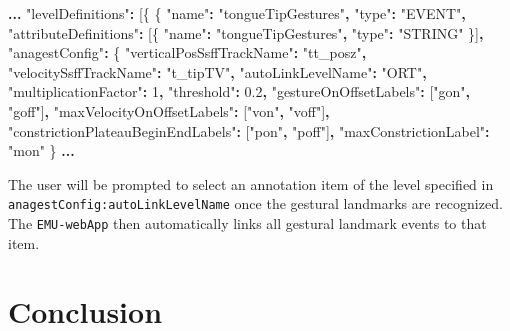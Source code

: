 \documentclass[
]{book}
\newenvironment{Shaded}{\begin{snugshade}}{\end{snugshade}}
\newcommand{\DecValTok}[1]{\textcolor[rgb]{0.00,0.00,0.81}{#1}}
\newcommand{\FloatTok}[1]{\textcolor[rgb]{0.00,0.00,0.81}{#1}}
\newcommand{\NormalTok}[1]{#1}
\newcommand{\OperatorTok}[1]{\textcolor[rgb]{0.81,0.36,0.00}{\textbf{#1}}}
\newcommand{\StringTok}[1]{\textcolor[rgb]{0.31,0.60,0.02}{#1}}
\begin{document}
\begin{Shaded}
\begin{Highlighting}[]
\OperatorTok{...}
\StringTok{"levelDefinitions"}\OperatorTok{:}\NormalTok{ [\{}
\NormalTok{  \{}
    \StringTok{"name"}\OperatorTok{:} \StringTok{"tongueTipGestures"}\OperatorTok{,}
    \StringTok{"type"}\OperatorTok{:} \StringTok{"EVENT"}\OperatorTok{,}
    \StringTok{"attributeDefinitions"}\OperatorTok{:}\NormalTok{ [\{}
        \StringTok{"name"}\OperatorTok{:} \StringTok{"tongueTipGestures"}\OperatorTok{,}
        \StringTok{"type"}\OperatorTok{:} \StringTok{"STRING"}
\NormalTok{    \}]}\OperatorTok{,}
    \StringTok{"anagestConfig"}\OperatorTok{:}\NormalTok{ \{}
        \StringTok{"verticalPosSsffTrackName"}\OperatorTok{:} \StringTok{"tt\_posz"}\OperatorTok{,}
        \StringTok{"velocitySsffTrackName"}\OperatorTok{:} \StringTok{"t\_tipTV"}\OperatorTok{,}
        \StringTok{"autoLinkLevelName"}\OperatorTok{:} \StringTok{"ORT"}\OperatorTok{,}
        \StringTok{"multiplicationFactor"}\OperatorTok{:} \DecValTok{1}\OperatorTok{,}
        \StringTok{"threshold"}\OperatorTok{:} \FloatTok{0.2}\OperatorTok{,}
        \StringTok{"gestureOnOffsetLabels"}\OperatorTok{:}\NormalTok{ [}\StringTok{"gon"}\OperatorTok{,} \StringTok{"goff"}\NormalTok{]}\OperatorTok{,}
        \StringTok{"maxVelocityOnOffsetLabels"}\OperatorTok{:}\NormalTok{ [}\StringTok{"von"}\OperatorTok{,} \StringTok{"voff"}\NormalTok{]}\OperatorTok{,}
        \StringTok{"constrictionPlateauBeginEndLabels"}\OperatorTok{:}\NormalTok{ [}\StringTok{"pon"}\OperatorTok{,} \StringTok{"poff"}\NormalTok{]}\OperatorTok{,}
        \StringTok{"maxConstrictionLabel"}\OperatorTok{:} \StringTok{"mon"}
\NormalTok{    \}}
\OperatorTok{...}
\end{Highlighting}
\end{Shaded}

The user will be prompted to select an annotation item of the level specified in \texttt{anagestConfig:autoLinkLevelName} once the gestural landmarks are recognized. The \texttt{EMU-webApp} then automatically links all gestural landmark events to that item.

\hypertarget{conclusion-5}{%
\section{Conclusion}\label{conclusion-5}}
\end{document}
